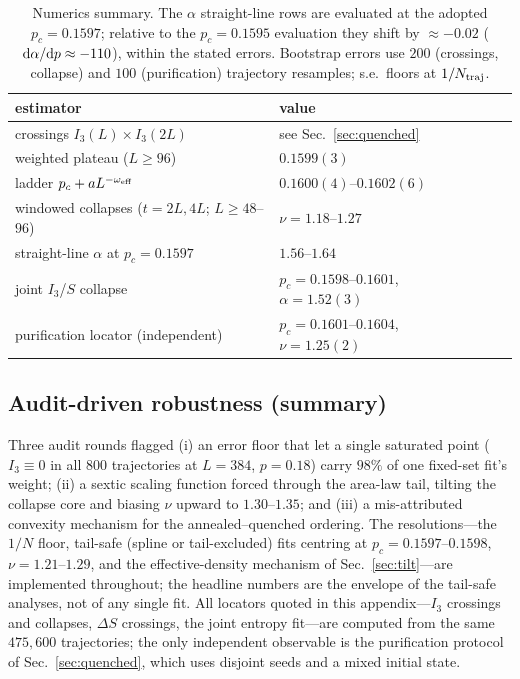 \documentclass[11pt]{article}
\begin{document}
\begin{table}[t]
\centering
\begin{tabular}{llll}
\toprule
estimator & value & & \\
\midrule
crossings $I_3(L)\times I_3(2L)$ & see Sec.~\ref{sec:quenched} & & \\
weighted plateau ($L\ge96$)      & $0.1599(3)$ & & \\
ladder $p_c+aL^{-\omega_{\rm eff}}$ & $0.1600(4)$--$0.1602(6)$ & & \\
windowed collapses ($t=2L,4L$; $L\ge48$--$96$) & $\nu=1.18$--$1.27$ & & \\
straight-line $\alpha$ at $p_c=0.1597$ & $1.56$--$1.64$ & & \\
joint $I_3$/$S$ collapse & $p_c=0.1598$--$0.1601$, $\alpha=1.52(3)$ & & \\
purification locator (independent) & $p_c=0.1601$--$0.1604$, $\nu=1.25(2)$ & & \\
\bottomrule
\end{tabular}
\caption{Numerics summary.  The $\alpha$ straight-line rows are evaluated at
the adopted $p_c=0.1597$; relative to the $p_c=0.1595$ evaluation they shift
by ${\approx}-0.02$ (${\rm d}\alpha/{\rm d}p\approx-110$), within the stated
errors.  Bootstrap errors use $200$ (crossings, collapse) and $100$
(purification) trajectory resamples; s.e.\ floors at $1/N_{\rm traj}$.}
\label{tab:numerics}
\end{table}

\subsection{Audit-driven robustness (summary)}
Three audit rounds flagged (i) an error floor that let a single saturated
point ($I_3\equiv0$ in all $800$ trajectories at $L=384$, $p=0.18$) carry
$98\%$ of one fixed-set fit's weight; (ii) a sextic scaling function forced
through the area-law tail, tilting the collapse core and biasing
$\nu$ upward to $1.30$--$1.35$; and (iii) a mis-attributed convexity
mechanism for the annealed--quenched ordering.  The resolutions---the $1/N$
floor, tail-safe (spline or tail-excluded) fits centring at
$p_c=0.1597$--$0.1598$, $\nu=1.21$--$1.29$, and the effective-density
mechanism of Sec.~\ref{sec:tilt}---are implemented throughout; the headline
numbers are the envelope of the tail-safe analyses, not of any single fit.
All locators quoted in this appendix---$I_3$ crossings and collapses,
$\Delta S$ crossings, the joint entropy fit---are computed from the same
$475{,}600$ trajectories; the only independent observable is the
purification protocol of Sec.~\ref{sec:quenched}, which uses disjoint seeds
and a mixed initial state.
\end{document}
